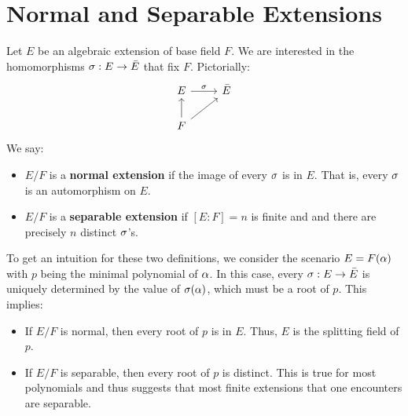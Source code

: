 \section{Normal and Separable Extensions}

Let $E$ be an algebraic extension of base field $F$. We are interested in the homomorphisms $\sigma: E \to \bar{E}$ that fix $F$. Pictorially:
\[
    \begin{tikzcd}
        E \arrow[r, "\sigma"]  & \bar{E} \\
        F \arrow[u] \arrow[ru] &        
    \end{tikzcd}
\]
We say:
\begin{itemize}
    \item $E/F$ is a \textbf{normal extension} if the image of every $\sigma$ is in $E$. That is, every $\sigma$ is an automorphism on $E$.
    \item $E/F$ is a \textbf{separable extension} if $[E : F] = n$ is finite and and there are precisely $n$ distinct $\sigma$'s.
\end{itemize}

To get an intuition for these two definitions, we consider the scenario $E = F(\alpha)$ with $p$ being the minimal polynomial of $\alpha$. In this case, every $\sigma: E \to \bar{E}$ is uniquely determined by the value of $\sigma(\alpha)$, which must be a root of $p$. This implies:
\begin{itemize}
    \item If $E/F$ is normal, then every root of $p$ is in $E$. Thus, $E$ is the splitting field of $p$.
    \item If $E/F$ is separable, then every root of $p$ is distinct. This is true for most polynomials and thus suggests that most finite extensions that one encounters are separable.
\end{itemize}